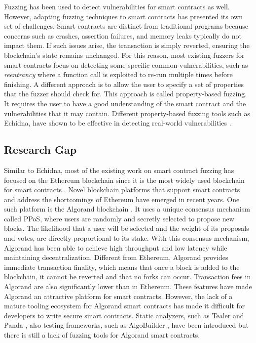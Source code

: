 Fuzzing has been used to detect vulnerabilities for smart contracts as well.
However, adapting fuzzing techniques to smart contracts has presented its own set of challenges.
Smart contracts are distinct from traditional programs because concerns such as crashes, assertion failures, and memory leaks typically do not impact them.
If such issues arise, the transaction is simply reverted, ensuring the blockchain's state remains unchanged.
For this reason, most existing fuzzers for smart contracts focus on detecting some specific common vulnerabilities, such as \textit{reentrancy} where a function call is exploited to re-run multiple times before finishing.
A different approach is to allow the user to specify a set of properties that the fuzzer should check for.
This approach is called property-based fuzzing.
It requires the user to have a good understanding of the smart contract and the vulnerabilities that it may contain.
Different property-based fuzzing tools such as Echidna, have shown to be effective in detecting real-world vulnerabilities \cite{grieco_echidna_2020, noauthor_echidna_nodate}.

\subsection*{Research Gap}
Similar to Echidna, most of the existing work on smart contract fuzzing has focused on the Ethereum blockchain since it is the most widely used blockchain for smart contracts \cite{guo_analysis_2022}.
Novel blockchain platforms that support smart contracts and address the shortcomings of Ethereum have emerged in recent years.
One such platform is the Algorand blockchain \cite{chen_algorand_2019}.
It uses a unique consensus mechanism called \ac{PPoS}, where users are randomly and secretly selected to propose new blocks.
The likelihood that a user will be selected and the weight of its proposals and votes, are directly proportional to its stake.
With this consensus mechanism, Algorand has been able to achieve high throughput and low latency while maintaining decentralization.
Different from Ethereum, Algorand provides immediate transaction finality, which means that once a block is added to the blockchain, it cannot be reverted and that no forks can occur.
Transaction fees in Algorand are also significantly lower than in Ethereum.
These features have made Algorand an attractive platform for smart contracts.
However, the lack of a mature tooling ecosystem for Algorand smart contracts has made it difficult for developers to write secure smart contracts.
Static analyzers, such as Tealer \cite{noauthor_crytictealer_nodate} and Panda \cite{sun_panda_2023}, also testing frameworks, such as AlgoBuilder \cite{noauthor_algo_nodate}, have been introduced but there is still a lack of fuzzing tools for Algorand smart contracts.

